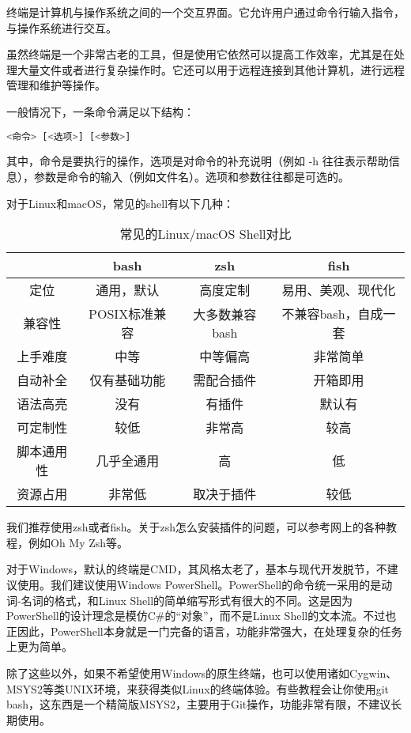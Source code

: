 \documentclass[../main.tex]{subfiles}
\begin{document}
终端是计算机与操作系统之间的一个交互界面。它允许用户通过命令行输入指令，与操作系统进行交互。

虽然终端是一个非常古老的工具，但是使用它依然可以提高工作效率，尤其是在处理大量文件或者进行复杂操作时。它还可以用于远程连接到其他计算机，进行远程管理和维护等操作。

一般情况下，一条命令满足以下结构：
\begin{lstlisting}[language=bash]
    <命令> [<选项>] [<参数>]
\end{lstlisting}

其中，命令是要执行的操作，选项是对命令的补充说明（例如 -h 往往表示帮助信息），参数是命令的输入（例如文件名）。选项和参数往往都是可选的。

对于Linux和macOS，常见的shell有以下几种：

\begin{table}[ht]
  \centering
  \begin{tabular}{c|ccc}
    \toprule
    & \textbf{bash} & \textbf{zsh} & \textbf{fish} \\
    \midrule
    定位 & 通用，默认 & 高度定制 & 易用、美观、现代化 \\
    兼容性 & POSIX标准兼容 & 大多数兼容bash & 不兼容bash，自成一套 \\
    上手难度 & 中等 & 中等偏高 & 非常简单 \\
    自动补全 & 仅有基础功能 & 需配合插件 & 开箱即用 \\
    语法高亮 & 没有 & 有插件 & 默认有 \\
    可定制性 & 较低 & 非常高 & 较高 \\
    脚本通用性 & 几乎全通用 & 高 & 低 \\
    资源占用 & 非常低 & 取决于插件 & 较低 \\
    \bottomrule
  \end{tabular}
  \caption{常见的Linux/macOS Shell对比}
\end{table}
我们推荐使用zsh或者fish。关于zsh怎么安装插件的问题，可以参考网上的各种教程，例如Oh My Zsh等。

对于Windows，默认的终端是CMD，其风格太老了，基本与现代开发脱节，不建议使用。我们建议使用Windows PowerShell。PowerShell的命令统一采用的是动词-名词的格式，和Linux Shell的简单缩写形式有很大的不同。这是因为PowerShell的设计理念是模仿C\#的“对象”，而不是Linux Shell的文本流。不过也正因此，PowerShell本身就是一门完备的语言，功能非常强大，在处理复杂的任务上更为简单。

除了这些以外，如果不希望使用Windows的原生终端，也可以使用诸如Cygwin、MSYS2等类UNIX环境，来获得类似Linux的终端体验。有些教程会让你使用git bash，这东西是一个精简版MSYS2，主要用于Git操作，功能非常有限，不建议长期使用。
\end{document}
